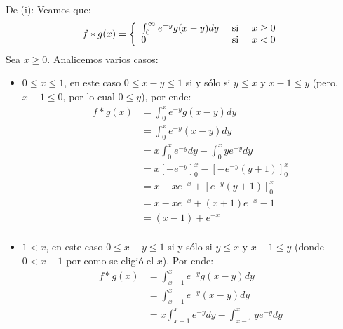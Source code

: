 \documentclass[12pt]{report}
\theoremstyle{largebreak}
\begin{document}
\begin{sol}
        De (i): Veamos que:
        \begin{equation*}
            \begin{split}
                f*g(x)&=\left\{
                    \begin{array}{lcr}
                       \int_0^\infty e^{-y}g(x-y)dy & \textup{ si } & x\geq0\\
                       0 & \textup{ si } & x<0\\ 
                    \end{array}
                \right.\\
            \end{split}
        \end{equation*}
        Sea $x\geq0$. Analicemos varios casos:
        \begin{itemize}
            \item $0\leq x\leq 1$, en este caso $0\leq x-y\leq 1$ si y sólo si  $y\leq x$ y $x-1\leq y$ (pero, $x-1\leq 0$, por lo cual $0\leq y$), por ende:
            \begin{equation*}
                \begin{split}
                    f*g(x)&=\int_0^x e^{-y}g(x-y)dy\\
                    &=\int_0^x e^{-y}(x-y)dy\\
                    &=x\int_0^x e^{-y}dy-\int_0^x ye^{-y}dy\\
                    &=x\left[-e^{-y} \right]_0^x-\left[-e^{-y}(y+1) \right]_0^x\\
                    &=x-xe^{-x}+\left[e^{-y}(y+1) \right]_0^x\\
                    &=x-xe^{-x}+(x+1)e^{-x}-1\\
                    &=(x-1)+e^{-x}\\
                \end{split}
            \end{equation*}
            \item $1<x$, en este caso $0\leq x-y\leq 1$ si y sólo si $y\leq x$ y $x-1\leq y$ (donde $0<x-1$ por como se eligió el $x$). Por ende:
            \begin{equation*}
                \begin{split}
                    f*g(x)&=\int_{x-1}^x e^{-y}g(x-y)dy\\
                    &=\int_{x-1}^x e^{-y}(x-y)dy\\
                    &=x\int_{x-1}^x e^{-y}dy-\int_{x-1}^xye^{-y}dy\\

\end{split}
\end{equation*}
\end{itemize}
\end{sol}
\end{document}
